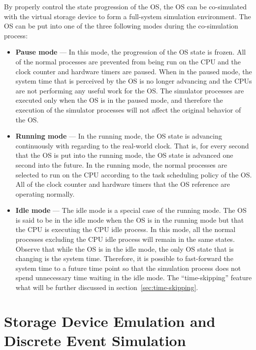 By properly control the state progression of the OS, the OS can be co-simulated with the virtual storage device to form a full-system simulation environment. The OS can be put into one of the three following modes during the co-simulation process:

\begin{itemize}
	\item \textbf{Pause mode} --- In this mode, the progression of the OS state is frozen. All of the normal processes are prevented from being run on the CPU and the clock counter and hardware timers are paused. When in the paused mode, the system time that is perceived by the OS is no longer advancing and the CPUs are not performing any useful work for the OS. The simulator processes are executed only when the OS is in the paused mode, and therefore the execution of the simulator processes will not affect the original behavior of the OS.
	
	\item \textbf{Running mode} --- In the running mode, the OS state is advancing continuously with regarding to the real-world clock. That is, for every second that the OS is put into the running mode, the OS state is advanced one second into the future. In the running mode, the normal processes are selected to run on the CPU according to the task scheduling policy of the OS. All of the clock counter and hardware timers that the OS reference are operating normally.

	\item \textbf{Idle mode} --- The idle mode is a special case of the running mode. The OS is said to be in the idle mode when the OS is in the running mode but that the CPU is executing the CPU idle process. In this mode, all the normal processes excluding the CPU idle process will remain in the same states. Observe that while the OS is in the idle mode, the only OS state that is changing is the system time. Therefore, it is possible to fast-forward the system time to a future time point so that the simulation process does not spend unnecessary time waiting in the idle mode. The ``time-skipping'' feature what will be further discussed in section~\ref{sec:time-skipping}.
\end{itemize}

\section{Storage Device Emulation and Discrete Event Simulation}
\label{sec:OS-state-pausing-and-storage-device-emulation}

